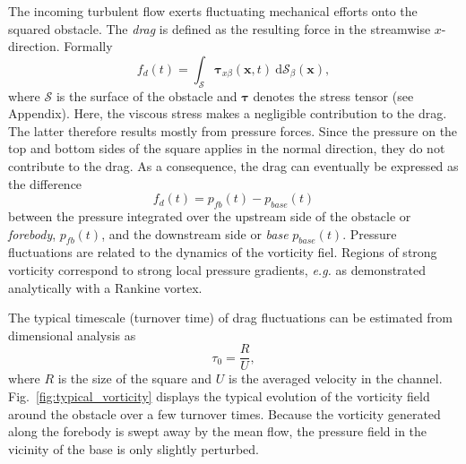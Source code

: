 \documentclass[pre,aps,floatfix,10pt,superscriptaddress, notitlepage,preprint]{revtex4-1}
\begin{document}

%
The incoming turbulent flow exerts fluctuating mechanical efforts onto the squared obstacle.
The \textit{drag} is defined as the resulting force in the streamwise $x$-direction. Formally 
\begin{equation}
\label{eq:drag_definition}
f_d(t) = \int_{\mathcal{S}} \boldsymbol{\tau}_{x \beta}(\mathbf{x},t) ~ \mathrm{d}{\mathcal{S}}_\beta(\mathbf{x}),
\end{equation}
where $\mathcal{S}$ is the surface of the obstacle and $\boldsymbol{\tau}$ denotes the stress tensor (see Appendix). 
Here, the viscous stress makes a negligible contribution to the drag. The latter therefore results mostly from pressure forces.
%
Since the pressure on the top and bottom sides of the square applies in the normal direction, they do not contribute to the drag. 
As a consequence, the drag can eventually be expressed as the difference 
\begin{equation}
\label{eq:drag_approx}
f_d(t) = p_{fb}(t) - p_{base}(t)
\end{equation}
between the pressure integrated over the upstream side of the obstacle or \textit{forebody}, $p_{fb}(t)$, and the downstream side or \textit{base} $p_{base}(t)$.
Pressure fluctuations are related to the dynamics of the vorticity fiel.
Regions of strong vorticity correspond to strong local pressure gradients, \emph{e.g.} as demonstrated analytically with a Rankine vortex.
%
%

%
The typical timescale (turnover time) of drag fluctuations can be estimated from dimensional analysis as
\begin{equation}
\label{eq:turnover_time}
\tau_0 = \frac{R}{U},
\end{equation}
where $R$ is the size of the square and $U$ is the averaged velocity in the channel. 
%
%
Fig.~\ref{fig:typical_vorticity} displays the typical evolution of the vorticity field around the obstacle over a few turnover times.
Because the vorticity generated along the forebody is swept away by the mean flow, the pressure field in the vicinity of the base is only slightly perturbed.
\end{document}
